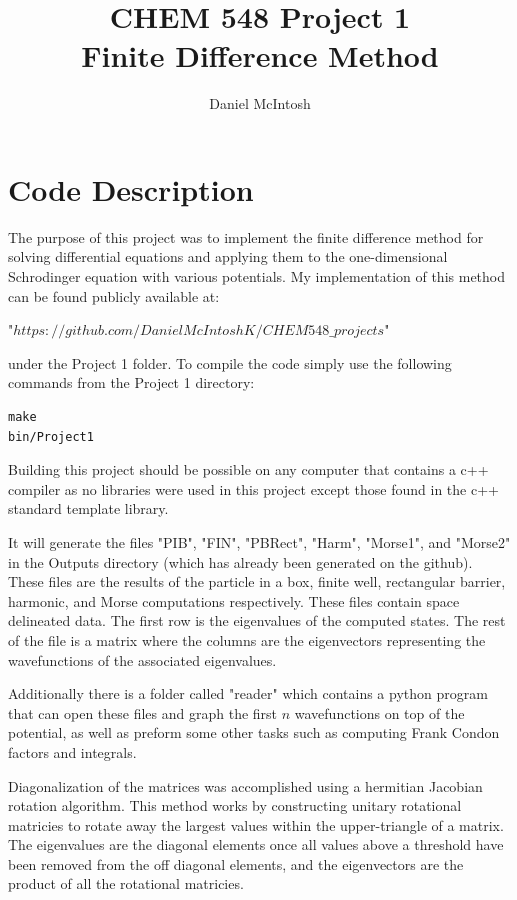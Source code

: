 \documentclass{article}
\title{CHEM 548 Project 1\\Finite Difference Method}
\author{Daniel McIntosh}
\begin{document}
\maketitle

\section*{Code Description}
The purpose of this project was to implement the finite difference method for solving differential equations and applying them to the one-dimensional Schrodinger equation with various potentials. My implementation of this method can be found publicly available at:
 
 "$https://github.com/DanielMcIntoshK/CHEM548\_projects$" 
 
under the Project 1 folder. To compile the code simply use the following commands from the Project 1 directory:

\begin{lstlisting}
make
bin/Project1
\end{lstlisting}

Building this project should be possible on any computer that contains a c++ compiler as no libraries were used in this project except those found in the c++ standard template library.

It will generate the files "PIB", "FIN", "PBRect", "Harm", "Morse1", and "Morse2" in the Outputs directory (which has already been generated on the github). These files are the results of the particle in a box, finite well, rectangular barrier, harmonic, and Morse computations respectively. These files contain space delineated data. The first row is the eigenvalues of the computed states. The rest of the file is a matrix where the columns are the eigenvectors representing the wavefunctions of the associated eigenvalues.

Additionally there is a folder called "reader" which contains a python program that can open these files and graph the first $n$ wavefunctions on top of the potential, as well as preform some other tasks such as computing Frank Condon factors and integrals.

Diagonalization of the matrices was accomplished using a hermitian Jacobian rotation algorithm. This method works by constructing unitary rotational matricies to rotate away the largest values within the upper-triangle of a matrix. The eigenvalues are the diagonal elements once all values above a threshold have been removed from the off diagonal elements, and the eigenvectors are the product of all the rotational matricies.
\end{document}
